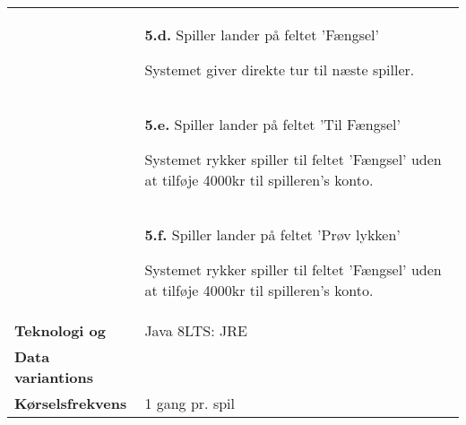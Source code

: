 \documentclass[class=article, crop=false]{standalone}
\begin{document}
\begin{table}[H]
\begin{tabularx}{\textwidth}{|l|X|}
                            & \textbf{5.d.} Spiller lander på feltet 'Fængsel'
                            \begin{enumerate} \begin{tabenum}
                                                  \item Systemet giver direkte tur til næste spiller.
                            \end{tabenum} \end{enumerate}
                            \\


                            & \textbf{5.e.} Spiller lander på feltet 'Til Fængsel'
                            \begin{enumerate} \begin{tabenum}
                                                  \item Systemet rykker spiller til feltet 'Fængsel' uden at tilføje 4000kr til spilleren's konto.
                            \end{tabenum} \end{enumerate}
                            \\



                            & \textbf{5.f.} Spiller lander på feltet 'Prøv lykken'
                            \begin{enumerate} \begin{tabenum}
                                                  \item Systemet rykker spiller til feltet 'Fængsel' uden at tilføje 4000kr til spilleren's konto.
                            \end{tabenum} \end{enumerate}
                            \\







            \hline








            \textbf{Teknologi og}     & Java 8LTS: JRE \\
            \textbf{Data variantions} &  \\ \hline
            \textbf{Kørselsfrekvens} & 1 gang pr. spil\\ \hline
        \end{tabularx}


    \end{table}
\end{document}
